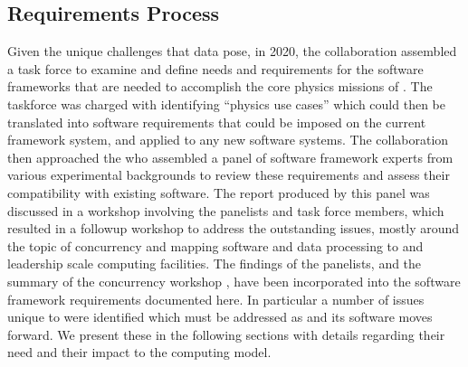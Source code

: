\documentclass[../main-v1.tex]{subfiles}
\begin{document}

\subsection{Requirements Process} \label{sec:req:proc}

Given the unique challenges that  data pose, in 2020, the collaboration assembled a task force to examine and define needs and requirements for the  software frameworks that are needed to accomplish the core physics missions of .  The taskforce was charged with identifying ``physics use cases''  which could then be translated into software requirements that could be imposed on the current framework system, and applied to any new software systems\cite{bib:docdb21934}.  The collaboration then approached the  who assembled a panel of software framework experts from various experimental backgrounds to review these requirements and assess their compatibility with existing  software. The report \cite{bib:docdb24423} produced by this panel was discussed in a workshop involving the panelists and task force members, which resulted in a followup workshop to address the outstanding issues, mostly around the topic of concurrency and mapping  software and data processing to  and leadership scale computing facilities.  The findings of the panelists, and the summary of the concurrency workshop \cite{bib:docdb24426}, have been incorporated into the  software framework requirements documented here.  In particular a number of issues unique to  were identified which must be addressed as  and its software moves forward.  We present these in the following sections with details regarding their need and their impact to the  computing model.
\end{document}
